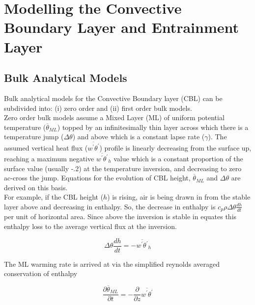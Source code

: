 \section{Modelling the Convective Boundary Layer and Entrainment Layer}
\label{sec:}

\subsection{Bulk Analytical Models}
\label{subsec:}
Bulk analytical models for the Convective Boundary layer (\acs{CBL}) can be subdivided into: (i) zero order
and (ii) first order bulk models.\\

Zero order bulk models assume a Mixed Layer (\acs{ML}) of uniform potential temperature ($\overline{\theta}_{ML}$) topped by an infinitesimally 
thin layer across which there is a temperature jump ($\Delta \theta$) and above which is a constant lapse rate ($\gamma$).  
The assumed vertical heat flux ($\overline{w^{'}\theta^{'}}$) profile is linearly decreasing from the surface up, reaching 
a maximum negative $\overline{w^{'}\theta^{'}}_{h}$ value which is a constant proportion of the surface value (usually -.2)
at the temperature inversion, and decreasing to zero ac-cross the jump.  Equations for the evolution of \acs{CBL} height,
 $\overline{\theta}_{ML}$ and $\Delta \theta$ are derived on this basis.\\

For example, if the \acs{CBL} height ($h$) is rising, air is being drawn in from the stable layer above and decreasing in enthalpy.
So, the decrease in enthalpy is $c_{p}\rho\Delta \theta \frac{dh}{dt}$ per unit of horizontal area.  Since above the 
inversion is stable \citeauthor{Tennekes73} in \cite{Tennekes73} equates this enthalpy loss to the average vertical flux at the inversion.

\begin{equation}
\Delta \theta \frac{dh}{dt} = -\overline{w^{'}\theta^{'}}_{h} 
\end{equation}  

The \acs{ML} warming rate is arrived at via the simplified reynolds averaged conservation of enthalpy

\begin{equation}
\frac{\partial \overline{\theta}_{ML}}{\partial t} = -\frac{\partial}{\partial z}\overline{w^{'}\theta^{'}}
\end{equation}

